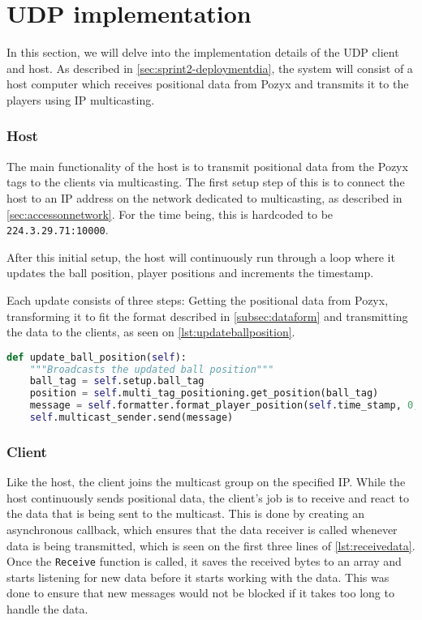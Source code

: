 \section{UDP implementation}
In this section, we will delve into the implementation details of the UDP client and host.
As described in \autoref{sec:sprint2-deploymentdia}, the system will consist of a host computer which receives positional data from Pozyx and transmits it to the players using IP multicasting.

\subsubsection{Host}
The main functionality of the host is to transmit positional data from the Pozyx tags to the clients via multicasting.
The first setup step of this is to connect the host to an IP address on the network dedicated to multicasting, as described in \autoref{sec:accessonnetwork}.
For the time being, this is hardcoded to be \texttt{224.3.29.71:10000}.

After this initial setup, the host will continuously run through a loop where it updates the ball position, player positions and increments the timestamp.

Each update consists of three steps: Getting the positional data from Pozyx, transforming it to fit the format described in \autoref{subsec:dataform} and transmitting the data to the clients, as seen on \autoref{lst:updateballposition}.

\begin{lstlisting}[caption={Updating ball position},language=Python,label={lst:updateballposition}]
def update_ball_position(self):
    """Broadcasts the updated ball position"""
    ball_tag = self.setup.ball_tag
    position = self.multi_tag_positioning.get_position(ball_tag)
    message = self.formatter.format_player_position(self.time_stamp, 0, position.x, position.y)
    self.multicast_sender.send(message)
\end{lstlisting}


\subsubsection{Client}
Like the host, the client joins the multicast group on the specified IP.
While the host continuously sends positional data, the client's job is to receive and react to the data that is being sent to the multicast.
This is done by creating an asynchronous callback, which ensures that the data receiver is called whenever data is being transmitted, which is seen on the first three lines of \autoref{lst:receivedata}.
Once the \texttt{Receive} function is called, it saves the received bytes to an array and starts listening for new data before it starts working with the data.
This was done to ensure that new messages would not be blocked if it takes too long to handle the data.

